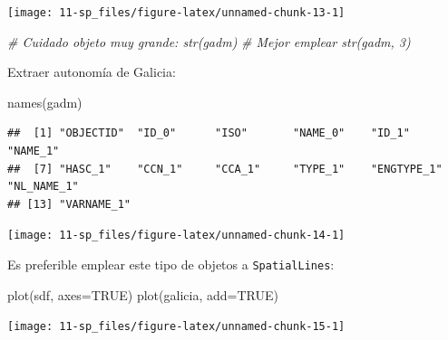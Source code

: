 \documentclass[
  spanish,
]{book}
\newenvironment{Shaded}{\begin{snugshade}}{\end{snugshade}}
\newcommand{\AttributeTok}[1]{\textcolor[rgb]{0.77,0.63,0.00}{#1}}
\newcommand{\CommentTok}[1]{\textcolor[rgb]{0.56,0.35,0.01}{\textit{#1}}}
\newcommand{\ConstantTok}[1]{\textcolor[rgb]{0.00,0.00,0.00}{#1}}
\newcommand{\FunctionTok}[1]{\textcolor[rgb]{0.00,0.00,0.00}{#1}}
\newcommand{\NormalTok}[1]{#1}
\newcommand{\OtherTok}[1]{\textcolor[rgb]{0.56,0.35,0.01}{#1}}
\newcommand{\SpecialCharTok}[1]{\textcolor[rgb]{0.00,0.00,0.00}{#1}}
\newcommand{\StringTok}[1]{\textcolor[rgb]{0.31,0.60,0.02}{#1}}
\theoremstyle{break}
\theoremstyle{definition}
\theoremstyle{definition}
\theoremstyle{definition}
\theoremstyle{definition}
\theoremstyle{remark}
\begin{document}
\begin{center}\texttt{[image: 11-sp\_files/figure-latex/unnamed-chunk-13-1]} \end{center}

\begin{Shaded}
\begin{Highlighting}[]
\CommentTok{\# Cuidado objeto muy grande: str(gadm)}
\CommentTok{\# Mejor emplear str(gadm, 3)}
\end{Highlighting}
\end{Shaded}

Extraer autonomía de Galicia:

\begin{Shaded}
\begin{Highlighting}[]
\FunctionTok{names}\NormalTok{(gadm)}
\end{Highlighting}
\end{Shaded}

\begin{verbatim}
##  [1] "OBJECTID"  "ID_0"      "ISO"       "NAME_0"    "ID_1"      "NAME_1"   
##  [7] "HASC_1"    "CCN_1"     "CCA_1"     "TYPE_1"    "ENGTYPE_1" "NL_NAME_1"
## [13] "VARNAME_1"
\end{verbatim}

\begin{Shaded}
\end{Shaded}

\begin{center}\texttt{[image: 11-sp\_files/figure-latex/unnamed-chunk-14-1]} \end{center}

Es preferible emplear este tipo de objetos a \texttt{SpatialLines}:

\begin{Shaded}
\begin{Highlighting}[]
\FunctionTok{plot}\NormalTok{(sdf, }\AttributeTok{axes=}\ConstantTok{TRUE}\NormalTok{)}
\FunctionTok{plot}\NormalTok{(galicia, }\AttributeTok{add=}\ConstantTok{TRUE}\NormalTok{)}
\end{Highlighting}
\end{Shaded}

\begin{center}\texttt{[image: 11-sp\_files/figure-latex/unnamed-chunk-15-1]} \end{center}
\end{document}
